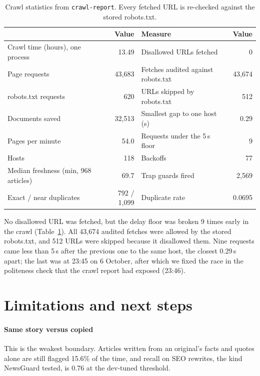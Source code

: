 \documentclass[11pt,a4paper]{article}
\newcommand{\hd}[1]{{\headfont\bfseries\footnotesize #1}}
\newcommand{\hrow}{\rowcolor{paper}}
\newcommand{\code}[1]{\texttt{#1}}
\begin{document}
\begin{table}[t]
  \centering\small
  \caption{Crawl statistics from \code{crawl-report}. Every fetched URL is re-checked against the stored robots.txt.}
  \label{tab:crawl}
  \begin{tabularx}{\textwidth}{@{}Xr@{\hspace{2.2em}}Xr@{}}
    \toprule
    \hrow \hd{Measure} & \hd{Value} & \hd{Measure} & \hd{Value} \\
    \midrule
    Crawl time (hours), one process & 13.49 & Disallowed URLs fetched & 0 \\
    Page requests & 43,683 & Fetches audited against robots.txt & 43,674 \\
    robots.txt requests & 620 & URLs skipped by robots.txt & 512 \\
    Documents saved & 32,513 & Smallest gap to one host (s) & 0.29 \\
    Pages per minute & 54.0 & Requests under the 5\,s floor & 9 \\
    Hosts & 118 & Backoffs & 77 \\
    Median freshness (min, 968 articles) & 69.7 & Trap guards fired & 2,569 \\
    Exact / near duplicates & 792 / 1,099 & Duplicate rate & 0.0695 \\
    \bottomrule
  \end{tabularx}
\end{table}

No disallowed URL was fetched, but the delay floor was broken 9 times early in the crawl (Table~\ref{tab:crawl}). All 43,674 audited fetches were allowed by the stored robots.txt, and 512 URLs were skipped because it disallowed them. Nine requests came less than 5\,s after the previous one to the same host, the closest 0.29\,s apart; the last was at 23:45 on 6 October, after which we fixed the race in the politeness check that the crawl report had exposed (23:46).

\section{Limitations and next steps}

\paragraph{Same story versus copied} This is the weakest boundary. Articles written from an original's facts and quotes alone are still flagged 15.6\% of the time, and recall on SEO rewrites, the kind NewsGuard tested, is 0.76 at the dev-tuned threshold.
\end{document}
